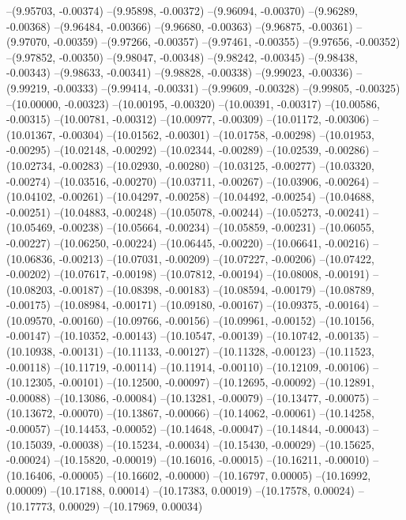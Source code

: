 --(9.95703, -0.00374)
--(9.95898, -0.00372)
--(9.96094, -0.00370)
--(9.96289, -0.00368)
--(9.96484, -0.00366)
--(9.96680, -0.00363)
--(9.96875, -0.00361)
--(9.97070, -0.00359)
--(9.97266, -0.00357)
--(9.97461, -0.00355)
--(9.97656, -0.00352)
--(9.97852, -0.00350)
--(9.98047, -0.00348)
--(9.98242, -0.00345)
--(9.98438, -0.00343)
--(9.98633, -0.00341)
--(9.98828, -0.00338)
--(9.99023, -0.00336)
--(9.99219, -0.00333)
--(9.99414, -0.00331)
--(9.99609, -0.00328)
--(9.99805, -0.00325)
--(10.00000, -0.00323)
--(10.00195, -0.00320)
--(10.00391, -0.00317)
--(10.00586, -0.00315)
--(10.00781, -0.00312)
--(10.00977, -0.00309)
--(10.01172, -0.00306)
--(10.01367, -0.00304)
--(10.01562, -0.00301)
--(10.01758, -0.00298)
--(10.01953, -0.00295)
--(10.02148, -0.00292)
--(10.02344, -0.00289)
--(10.02539, -0.00286)
--(10.02734, -0.00283)
--(10.02930, -0.00280)
--(10.03125, -0.00277)
--(10.03320, -0.00274)
--(10.03516, -0.00270)
--(10.03711, -0.00267)
--(10.03906, -0.00264)
--(10.04102, -0.00261)
--(10.04297, -0.00258)
--(10.04492, -0.00254)
--(10.04688, -0.00251)
--(10.04883, -0.00248)
--(10.05078, -0.00244)
--(10.05273, -0.00241)
--(10.05469, -0.00238)
--(10.05664, -0.00234)
--(10.05859, -0.00231)
--(10.06055, -0.00227)
--(10.06250, -0.00224)
--(10.06445, -0.00220)
--(10.06641, -0.00216)
--(10.06836, -0.00213)
--(10.07031, -0.00209)
--(10.07227, -0.00206)
--(10.07422, -0.00202)
--(10.07617, -0.00198)
--(10.07812, -0.00194)
--(10.08008, -0.00191)
--(10.08203, -0.00187)
--(10.08398, -0.00183)
--(10.08594, -0.00179)
--(10.08789, -0.00175)
--(10.08984, -0.00171)
--(10.09180, -0.00167)
--(10.09375, -0.00164)
--(10.09570, -0.00160)
--(10.09766, -0.00156)
--(10.09961, -0.00152)
--(10.10156, -0.00147)
--(10.10352, -0.00143)
--(10.10547, -0.00139)
--(10.10742, -0.00135)
--(10.10938, -0.00131)
--(10.11133, -0.00127)
--(10.11328, -0.00123)
--(10.11523, -0.00118)
--(10.11719, -0.00114)
--(10.11914, -0.00110)
--(10.12109, -0.00106)
--(10.12305, -0.00101)
--(10.12500, -0.00097)
--(10.12695, -0.00092)
--(10.12891, -0.00088)
--(10.13086, -0.00084)
--(10.13281, -0.00079)
--(10.13477, -0.00075)
--(10.13672, -0.00070)
--(10.13867, -0.00066)
--(10.14062, -0.00061)
--(10.14258, -0.00057)
--(10.14453, -0.00052)
--(10.14648, -0.00047)
--(10.14844, -0.00043)
--(10.15039, -0.00038)
--(10.15234, -0.00034)
--(10.15430, -0.00029)
--(10.15625, -0.00024)
--(10.15820, -0.00019)
--(10.16016, -0.00015)
--(10.16211, -0.00010)
--(10.16406, -0.00005)
--(10.16602, -0.00000)
--(10.16797, 0.00005)
--(10.16992, 0.00009)
--(10.17188, 0.00014)
--(10.17383, 0.00019)
--(10.17578, 0.00024)
--(10.17773, 0.00029)
--(10.17969, 0.00034)
